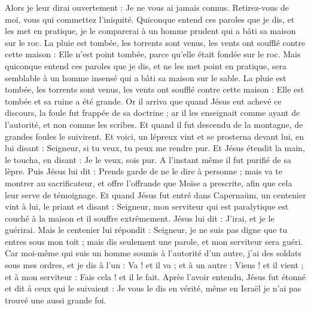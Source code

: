 \begin{multicols}{2}
Alors je leur dirai ouvertement : Je ne vous ai jamais connus. Retirez-vous de moi, vous qui commettez l'iniquité.
Quiconque entend ces paroles que je dis, et les met en pratique, je le comparerai à un homme prudent qui a bâti sa maison sur le roc.
La pluie est tombée, les torrents sont venus, les vents ont soufflé contre cette maison : Elle n'est point tombée, parce qu'elle était fondée sur le roc.
Mais quiconque entend ces paroles que je dis, et ne les met point en pratique, sera semblable à un homme insensé qui a bâti sa maison sur le sable.
La pluie est tombée, les torrents sont venus, les vents ont soufflé contre cette maison : Elle est tombée et sa ruine a été grande.
Or il arriva que quand Jésus eut achevé ce discours, la foule fut frappée de sa doctrine ;
ar il les enseignait comme ayant de l’autorité, et non comme les scribes.
\VerseOne{}Et quand il fut descendu de la montagne, de grandes foules le suivirent.
Et voici, un lépreux vint et se prosterna devant lui, en lui disant : Seigneur, si tu veux, tu peux me rendre pur.
Et Jésus étendit la main, le toucha, en disant : Je le veux, sois pur. A l’instant même il fut purifié de sa lèpre.
Puis Jésus lui dit : Prends garde de ne le dire à personne ; mais va te montrer au sacrificateur, et offre l’offrande que Moïse a prescrite, afin que cela leur serve de témoignage.
Et quand Jésus fut entré dans Capernaüm, un centenier vint à lui, le priant
et disant : Seigneur, mon serviteur qui est paralytique est couché à la maison et il souffre extrêmement.
Jésus lui dit : J'irai, et je le guérirai.
Mais le centenier lui répondit : Seigneur, je ne suis pas digne que tu entres sous mon toit ; mais dis seulement une parole, et mon serviteur sera guéri.
Car moi-même qui suis un homme soumis à l’autorité d’un autre, j'ai des soldats sous mes ordres, et je dis à l'un : Va ! et il va ; et à un autre : Viens ! et il vient ; et à mon serviteur : Fais cela ! et il le fait.
Après l’avoir entendu, Jésus fut étonné et dit à ceux qui le suivaient : Je vous le dis en vérité, même en Israël je n'ai pas trouvé une aussi grande foi.

\end{multicols}
